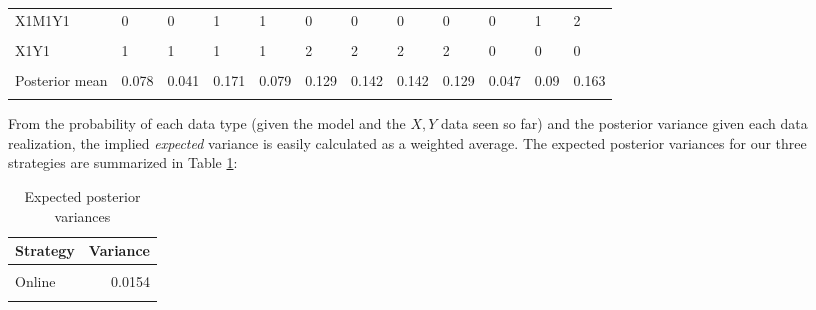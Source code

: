 \documentclass[
  12pt,
]{book}
\begin{document}
\begin{table}
{\begin{tabular}[t]{llllllllllll}
X1M1Y1 & 0 & 0 & 1 & 1 & 0 & 0 & 0 & 0 & 0 & 1 & 2\\
\addlinespace
\cellcolor{gray!6}{X1Y0} & \cellcolor{gray!6}{1} & \cellcolor{gray!6}{1} & \cellcolor{gray!6}{1} & \cellcolor{gray!6}{1} & \cellcolor{gray!6}{0} & \cellcolor{gray!6}{0} & \cellcolor{gray!6}{0} & \cellcolor{gray!6}{0} & \cellcolor{gray!6}{1} & \cellcolor{gray!6}{1} & \cellcolor{gray!6}{1}\\
X1Y1 & 1 & 1 & 1 & 1 & 2 & 2 & 2 & 2 & 0 & 0 & 0\\
\cellcolor{gray!6}{Probability} & \cellcolor{gray!6}{0.165} & \cellcolor{gray!6}{0.029} & \cellcolor{gray!6}{0.632} & \cellcolor{gray!6}{0.174} & \cellcolor{gray!6}{0.262} & \cellcolor{gray!6}{0.234} & \cellcolor{gray!6}{0.234} & \cellcolor{gray!6}{0.271} & \cellcolor{gray!6}{0.076} & \cellcolor{gray!6}{0.235} & \cellcolor{gray!6}{0.688}\\
Posterior mean & 0.078 & 0.041 & 0.171 & 0.079 & 0.129 & 0.142 & 0.142 & 0.129 & 0.047 & 0.09 & 0.163\\
\cellcolor{gray!6}{Posterior variance} & \cellcolor{gray!6}{0.008} & \cellcolor{gray!6}{0.003} & \cellcolor{gray!6}{0.02} & \cellcolor{gray!6}{0.007} & \cellcolor{gray!6}{0.017} & \cellcolor{gray!6}{0.018} & \cellcolor{gray!6}{0.018} & \cellcolor{gray!6}{0.016} & \cellcolor{gray!6}{0.003} & \cellcolor{gray!6}{0.009} & \cellcolor{gray!6}{0.02}\\
\bottomrule
\end{tabular}}
\end{table}

From the probability of each data type (given the model and the \(X,Y\) data seen so far) and the posterior variance given each data realization, the implied \emph{expected} variance is easily calculated as a weighted average. The expected posterior variances for our three strategies are summarized in Table \ref{tab:exppostvar}:

\begin{table}

\caption{\label{tab:exppostvar}Expected posterior variances}
\centering
\begin{tabular}[t]{lr}
\toprule
Strategy & Variance\\
\midrule
\cellcolor{gray!6}{Offline} & \cellcolor{gray!6}{0.0172}\\
Online & 0.0154\\
\cellcolor{gray!6}{Two X=1, Y=1 cases} & \cellcolor{gray!6}{0.0160}\\
\bottomrule
\end{tabular}
\end{table}
\end{document}
